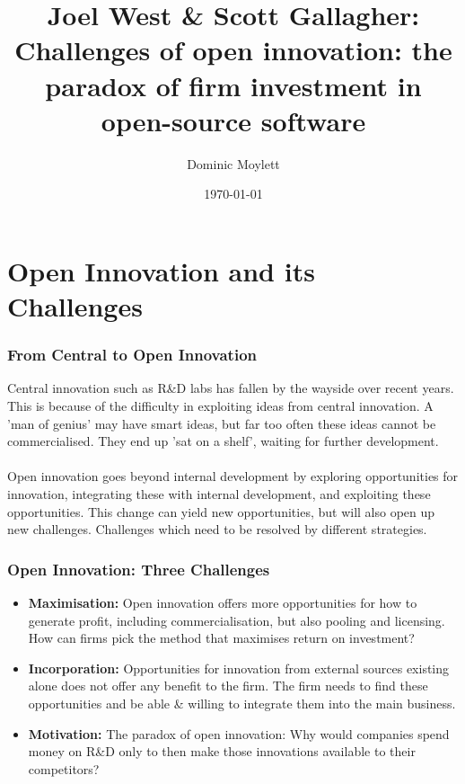 \documentclass{beamer}
\title[Challenges of open innovation]{Joel West \& Scott Gallagher: Challenges of open innovation: the paradox of firm investment in open-source software} %
\author{Dominic Moylett} %
\institute[University of Bristol] %
{
University of Bristol \\ %
\medskip
\textit{dominic.moylett.2011@my.bristol.ac.uk} %
}
\date{\today} %
\begin{document}
\begin{frame}
\titlepage %
\end{frame}


\section{Open Innovation and its Challenges}

\begin{frame}
\frametitle{From Central to Open Innovation}
Central innovation such as R\&D labs has fallen by the wayside over recent years. This is because of the difficulty in exploiting ideas from central innovation. A 'man of genius' may have smart ideas, but far too often these ideas cannot be commercialised. They end up 'sat on a shelf', waiting for further development.\\~\\

Open innovation goes beyond internal development by exploring opportunities for innovation, integrating these with internal development, and exploiting these opportunities. This change can yield new opportunities, but will also open up new challenges. Challenges which need to be resolved by different strategies.
\end{frame}


\begin{frame}
\frametitle{Open Innovation: Three Challenges}
\begin{itemize}
\item \textbf{Maximisation:} Open innovation offers more opportunities for how to generate profit, including commercialisation, but also pooling and licensing. How can firms pick the method that maximises return on investment?
\item \textbf{Incorporation:} Opportunities for innovation from external sources existing alone does not offer any benefit to the firm. The firm needs to find these opportunities and be able \& willing to integrate them into the main business.
\item \textbf{Motivation:} The paradox of open innovation: Why would companies spend money on R\&D only to then make those innovations available to their competitors?
\end{itemize}
\end{frame}
\end{document}
